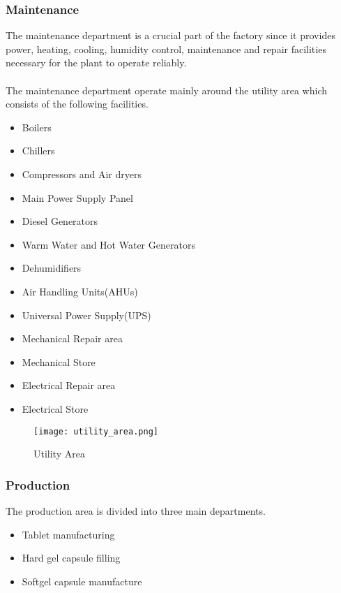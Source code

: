 \documentclass[a4paper,12pt]{article}
\begin{document}
			\newpage
			\subsubsection{Maintenance}
		The maintenance department is a crucial part of the factory since it provides power, heating, cooling, humidity control, maintenance and repair facilities necessary for the plant to operate reliably.
		\\
		\\
		The maintenance department operate mainly around the utility area which consists of the following facilities.
		\begin{itemize}
			\item Boilers
			\item Chillers
			\item Compressors and Air dryers
			\item Main Power Supply Panel
			\item Diesel Generators
			\item Warm Water and Hot Water Generators
			\item Dehumidifiers
			\item Air Handling Units(AHUs)
			\item Universal Power Supply(UPS)
			\item Mechanical Repair area
			\item Mechanical Store
			\item Electrical Repair area
			\item Electrical Store
		\end{itemize}
		
		\newpage
			\begin{figure}[H]
				\begin{center}				
					\texttt{[image: utility\_area.png]}
				\end{center}
				\caption{Utility Area}
				\label{fig:Utility Area}
			\end{figure}
		
		\newpage	
			\subsubsection{Production}
			
			The production area is divided into three main departments.
			\begin{itemize}
				\item Tablet manufacturing
				\item Hard gel capsule filling
				\item Softgel capsule manufacture				
			\end{itemize}
			
\end{document}
